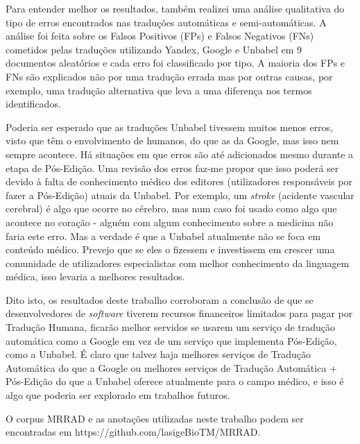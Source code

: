 \begin{abstractspt}
Para entender melhor os resultados, também realizei uma análise qualitativa do tipo de erros encontrados nas traduções automáticas e semi-automáticas. A análise foi feita sobre os Falsos Positivos (FPs) e Falsos Negativos (FNs) cometidos pelas traduções utilizando Yandex, Google e Unbabel em 9 documentos aleatórios e cada erro foi classificado por tipo. A maioria dos FPs e FNs são explicados não por uma tradução errada mas por outras causas, por exemplo, uma tradução alternativa que leva a uma diferença nos termos identificados. 

Poderia ser esperado que as traduções Unbabel tivessem muitos menos erros, visto que têm o envolvimento de humanos, do que as da Google, mas isso nem sempre acontece. Há situações em que erros são até adicionados mesmo durante a etapa de Pós-Edição. Uma revisão dos erros faz-me propor que isso poderá ser devido à falta de conhecimento médico dos editores (utilizadores responsáveis por fazer a Pós-Edição) atuais da Unbabel. Por exemplo, um \textit{stroke} (acidente vascular cerebral) é algo que ocorre no cérebro, mas num caso foi usado como algo que acontece no coração - alguém com algum conhecimento sobre a medicina não faria este erro. Mas a verdade é que a Unbabel atualmente não se foca em conteúdo médico. Prevejo que se eles o fizessem e investissem em crescer uma comunidade de utilizadores especialistas com melhor conhecimento da linguagem médica, isso levaria a melhores resultados.

Dito isto, os resultados deste trabalho corroboram a conclusão de que se desenvolvedores de \textit{software} tiverem recursos financeiros limitados para pagar por Tradução Humana, ficarão melhor servidos se usarem um serviço de tradução automática como a Google em vez de um serviço que implementa Pós-Edição, como a Unbabel. É claro que talvez haja melhores serviços de Tradução Automática do que a Google ou melhores serviços de Tradução Automática + Pós-Edição do que a Unbabel oferece atualmente para o campo médico, e isso é algo que poderia ser explorado em trabalhos futuros.

O corpus MRRAD e as anotações utilizadas neste trabalho podem ser encontradas em https://github.com/lasigeBioTM/MRRAD.

\end{abstractspt}

